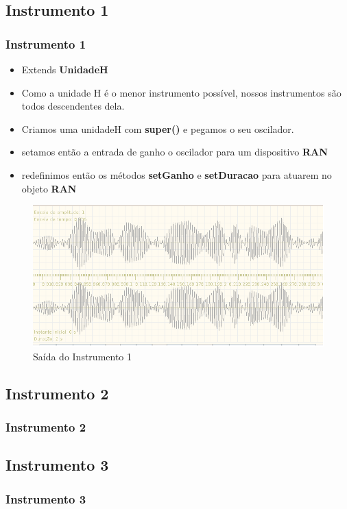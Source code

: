 \documentclass{beamer}
\begin{document}
\subsection{Instrumento 1}
\begin{frame}
 \frametitle{Instrumento 1}
 \begin{itemize}
 \item Extends \textbf{UnidadeH}
 \item Como a unidade H é o menor instrumento possível, nossos instrumentos são todos
 descendentes dela.
 \item Criamos uma unidadeH com \textbf{super()} e pegamos o seu oscilador.
 \item setamos então a entrada de ganho o oscilador para um dispositivo \textbf{RAN}
 \item redefinimos então os métodos \textbf{setGanho} e \textbf{setDuracao} para atuarem no objeto \textbf{RAN}
 \end{itemize}
\end{frame}

\begin{frame}
 \begin{figure}
  \includegraphics[scale=0.4]{./images/ins1.png}
  \caption{Saída do Instrumento 1}
 \end{figure} 
\end{frame}
\subsection{Instrumento 2}
\begin{frame}
 \frametitle{Instrumento 2}
\end{frame}

\subsection{Instrumento 3}
\begin{frame}
 \frametitle{Instrumento 3}
\end{frame}
\end{document}
